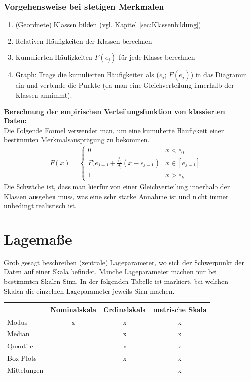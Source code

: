 \documentclass[a4paper]{article}
\begin{document}
\subsubsection{Vorgehensweise bei stetigen Merkmalen}
\begin{enumerate}
    \item (Geordnete) Klassen bilden (vgl. Kapitel \ref{sec:Klassenbildung})
    \item Relativen Häufigkeiten der Klassen berechnen
    \item Kumulierten Häufigkeiten $F(e_j)$ für jede Klasse berechnen
    \item Graph: Trage die kumulierten Häufigkeiten als ($e_j$; $F(e_j)$) in das Diagramm ein und verbinde die Punkte (da man eine Gleichverteilung innerhalb der Klassen annimmt).
\end{enumerate}
\textbf{Berechnung der empirischen Verteilungsfunktion von klassierten Daten:}\\
Die Folgende Formel verwendet man, um eine kumulierte Häufigkeit einer bestimmten Merkmalsausprägung zu bekommen.
\begin{align*}
    F(x)=\begin{cases}
			0      & x < e_0        \\
            F(e_{j-1}+\frac{f_j}{d_j}(x-e_{j-1}) & x \in[e_{j-1}]\\
            1      &x>e_k
		 \end{cases}
\end{align*}
Die Schwäche ist, dass man hierfür von einer Gleichverteilung innerhalb der Klassen ausgehen muss, was eine sehr starke Annahme ist und nicht immer unbedingt realistisch ist.\\

\noindent {}


\clearpage


\section{Lagemaße}
Grob gesagt beschreiben (zentrale) Lageparameter, wo sich der Schwerpunkt der Daten auf einer Skala befindet. Manche Lageparameter machen nur bei bestimmten Skalen Sinn. In der folgenden Tabelle ist markiert, bei welchen Skalen die einzelnen Lageparameter jeweils Sinn machen.

\begin{center}
 \begin{tabular}{|l c c c|} 
 \hline
 & Nominalskala & Ordinalskala& metrische Skala\\
 \hline\hline
 Modus &x & x & x \\ 
 \hline
 Median &  & x & x \\
 \hline
 Quantile &  & x & x \\
 \hline
 Box-Plots &  & x & x \\
 \hline
Mittelungen &  &  & x \\
 \hline
\end{tabular}
\end{center}
\end{document}
